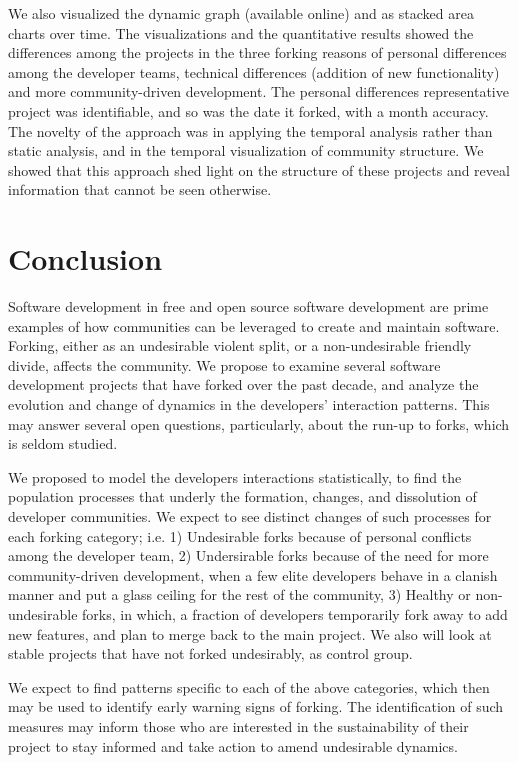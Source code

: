 \documentclass{acm_proc_article-sp}
\begin{document}
We also visualized the dynamic graph (available online) and as stacked area charts over time. The visualizations and the quantitative results showed the differences among the projects in the three forking reasons of personal differences among the developer teams, technical differences (addition of new functionality) and more community-driven development. The personal differences representative project was identifiable, and so was the date it forked, with a month accuracy. The novelty of the approach was in applying the temporal analysis rather than static analysis, and in the temporal visualization of community structure. We showed that this approach shed light on the structure of these projects and reveal information that cannot be seen otherwise.

\section{Conclusion}
Software development in free and open source software development are prime examples of how communities can be leveraged to create and maintain software. Forking, either as an undesirable violent split, or a non-undesirable friendly divide, affects the community. We propose to examine several software development projects that have forked over the past decade, and analyze the evolution and change of dynamics in the developers' interaction patterns. This may answer several open questions, particularly, about the run-up to forks, which is seldom studied.

We proposed to model the developers interactions statistically, to find the population processes that underly the formation, changes, and dissolution of developer communities. We expect to see distinct changes of such processes for each forking category; i.e. 1) Undesirable forks because of personal conflicts among the developer team, 2) Undersirable forks because of the need for more community-driven development, when a few elite developers behave in a clanish manner and put a glass ceiling for the rest of the community, 3) Healthy or non-undesirable forks, in which, a fraction of developers temporarily fork away to add new features, and plan to merge back to the main project. We also will look at stable projects that have not forked undesirably, as control group. 

We expect to find patterns specific to each of the above categories, which then may be used to identify early warning signs of forking. The identification of such measures may inform those who are interested in the sustainability of their project to stay informed and take action to amend undesirable dynamics. 
\end{document}
